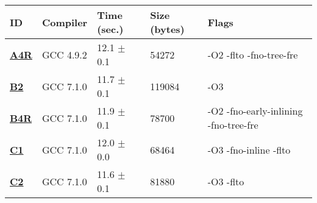     \begin{tabular}{|l|l|l|l|p{3.2in}|}
     \hline
      \textbf{ID} & \textbf{Compiler} & \textbf{Time (sec.)} & \textbf{Size (bytes)} & \textbf{Flags} \\ 
     \hline
      \textbf{ \href{http://cknowledge.org/repo/web.php?wcid=experiment:f5489592a3a15bf3\&subpoint=6236b2e4742629aa}{A4R} } &  GCC 4.9.2  &  12.1 $\pm$ 0.1  &  54272  & {\small -O2 -flto -fno-tree-fre }\\
     \hline
      \textbf{ \href{http://cknowledge.org/repo/web.php?wcid=experiment:45b844dc97bc88bb\&subpoint=c88f2a728405d8eb}{B2} } &  GCC 7.1.0  &  11.7 $\pm$ 0.1  &  119084  & {\small -O3 }\\
     \hline
      \textbf{ \href{http://cknowledge.org/repo/web.php?wcid=experiment:b642fbace509ae5a\&subpoint=cd944d398d208b53}{B4R} } &  GCC 7.1.0  &  11.9 $\pm$ 0.1  &  78700  & {\small -O2 -fno-early-inlining -fno-tree-fre }\\
     \hline
      \textbf{ \href{http://cknowledge.org/repo/web.php?wcid=experiment:f89c04c152682687\&subpoint=9a4548dd347699b7}{C1} } &  GCC 7.1.0  &  12.0 $\pm$ 0.0  &  68464  & {\small -O3 -fno-inline -flto }\\
     \hline
      \textbf{ \href{http://cknowledge.org/repo/web.php?wcid=experiment:f89c04c152682687\&subpoint=b5a6ade146d9b028}{C2} } &  GCC 7.1.0  &  11.6 $\pm$ 0.1  &  81880  & {\small -O3 -flto }\\
     \hline
    \end{tabular}    